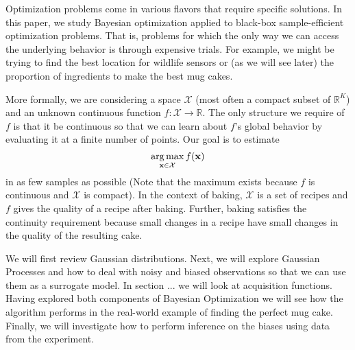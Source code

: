 Optimization problems come in various flavors that require specific solutions.
In this paper, we study Bayesian optimization applied to black-box sample-efficient optimization problems.
That is, problems for which the only way we can access the underlying behavior is through expensive trials.
For example, we might be trying to find the best location for wildlife sensors or (as we will see later) the proportion of ingredients to make the best mug cakes.

More formally, we are considering a space $\mathcal{X}$ (most often a compact subset of $\mathbb{R}^{K}$) and an unknown continuous function $f: \mathcal{X} \to \mathbb{R}$.
The only structure we require of $f$ is that it be continuous so that we can learn about $f$'s global behavior by evaluating it at a finite number of points.
Our goal is to estimate
\begin{equation}\label{eq:obj}
    \operatorname*{arg\,max}_{\mathbf{x} \in \mathcal{X}} f(\mathbf{x})
\end{equation}
in as few samples as possible 
(Note that the maximum exists because $f$ is continuous and $\mathcal{X}$ is compact).
In the context of baking, $\mathcal{X}$ is a set of recipes and $f$ gives the quality of a recipe after baking.
Further, baking satisfies the continuity requirement because small changes in a recipe have small changes in the quality of the resulting cake.

We will first review Gaussian distributions.
Next, we will explore Gaussian Processes and how to deal with noisy and biased observations
so that we can use them as a surrogate model.
In section ... we will look at acquisition functions.
Having explored both components of Bayesian Optimization we will see how the algorithm performs in the real-world example of finding the perfect mug cake.
Finally, we will investigate how to perform inference on the biases using data from the experiment.
